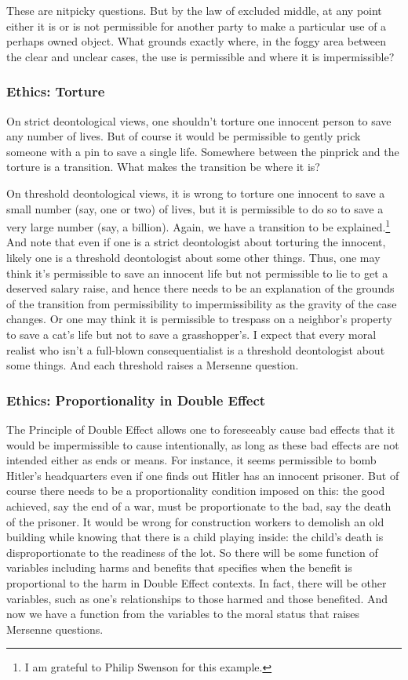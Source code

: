 These are nitpicky questions. But by the law of excluded middle, at any point either it is or is not permissible 
for another party to make a 
particular use of a perhaps owned object. What grounds exactly where, in the foggy area between the clear and unclear cases, the
use is permissible and where it is impermissible? 

\subsubsection{Ethics: Torture}
On strict deontological views, one shouldn't torture one innocent person to save any number of lives. But of course
it would be permissible to gently prick someone with a pin to save a single life. Somewhere between the pinprick
and the torture is a transition. What makes the transition be where it is?

On threshold deontological views, it is wrong to torture one innocent to save a small number (say, one or two) of lives,
but it is permissible to do so to save a very large number (say, a billion). Again, we have a transition to be 
explained.\footnote{I am grateful to Philip Swenson for this example.} And note that even if one is a strict deontologist
about torturing the innocent, likely one is a threshold deontologist about some other things. Thus, one may think it's
permissible to save an innocent life but not permissible to lie to get a deserved salary raise,
and hence there needs to be an explanation of the grounds of the transition from permissibility to impermissibility
as the gravity of the case changes. Or
one may think it is permissible to trespass on a neighbor's property to save a cat's life but not to save a grasshopper's.
I expect that every moral realist who isn't a full-blown consequentialist is a threshold deontologist about some things.
And each threshold raises a Mersenne question.

\subsubsection{Ethics: Proportionality in Double Effect}
The Principle of Double Effect allows one to foreseeably cause bad effects that it would
be impermissible to cause intentionally, as long as these bad effects are not intended either as ends or means. For instance, it seems permissible to bomb Hitler's headquarters even
if one finds out Hitler has an innocent prisoner. But of course there needs to be a proportionality
condition imposed on this: the good achieved, say the end of a war, must be proportionate to the bad, say the death of the prisoner. 
It would be wrong for construction workers to demolish an old building while knowing that there is a child playing inside: 
the child's death is disproportionate to the readiness of the lot. So there will be some function of variables including harms and benefits that
specifies when the benefit is proportional to the harm in Double Effect contexts. In fact, there will be other variables, such as
one's relationships to those harmed and those benefited.  And now we have a function from the variables to the moral
status that raises Mersenne questions.

